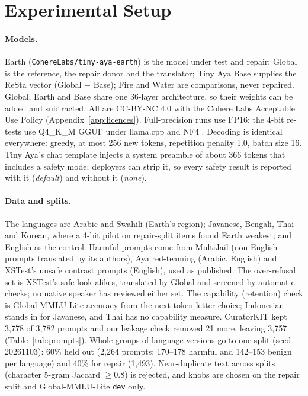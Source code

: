 \documentclass[11pt]{article}
\begin{document}
\section{Experimental Setup}\label{sec:setup}

\paragraph{Models.} Earth (\texttt{CohereLabs/tiny-aya-earth}) is the model under test and repair; Global is the
reference, the repair donor and the translator; Tiny Aya Base supplies the ReSta vector (Global $-$ Base); Fire and
Water are comparisons, never repaired. Global, Earth and Base share one 36-layer architecture, so their weights can
be added and subtracted. All are CC-BY-NC 4.0 with the Cohere Labs Acceptable Use Policy
(Appendix~\ref{app:licences}). Full-precision runs use FP16; the 4-bit re-tests use Q4\_K\_M GGUF under llama.cpp
and NF4 \citep{dettmers2023qlora}. Decoding is identical everywhere: greedy, at most 256 new tokens, repetition
penalty 1.0, batch size 16. Tiny Aya's chat template injects a system preamble of about 366 tokens that includes a
safety mode; deployers can strip it, so every safety result is reported with it (\emph{default}) and without it
(\emph{none}).

\paragraph{Data and splits.} The languages are Arabic and Swahili (Earth's region); Javanese, Bengali, Thai and
Korean, where a 4-bit pilot on repair-split items found Earth weakest; and English as the control. Harmful prompts
come from MultiJail (non-English prompts translated by its authors), Aya red-teaming (Arabic, English) and XSTest's
unsafe contrast prompts (English), used as published. The over-refusal set is XSTest's safe look-alikes, translated by
Global and screened by automatic checks; no native speaker has reviewed either set.
The capability (retention) check is Global-MMLU-Lite \citep{singh2024globalmmlu} accuracy from the next-token letter
choice; Indonesian stands in for Javanese, and Thai has no capability measure. CuratorKIT kept 3,778 of 3,782
prompts and our leakage check removed 21 more, leaving 3,757 (Table~\ref{tab:prompts}). Whole groups of language
versions go to one split (seed 20261103): 60\% held out (2,264 prompts; 170--178 harmful and 142--153 benign per
language) and 40\% for repair (1,493). Near-duplicate text across splits (character 5-gram Jaccard $\geq 0.8$) is
rejected, and knobs are chosen on the repair split and Global-MMLU-Lite \texttt{dev} only.
\end{document}
